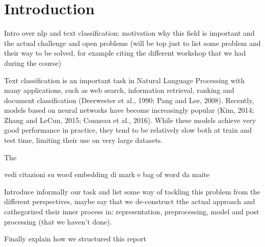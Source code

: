 \section{Introduction} \label{sec:introduction}

Intro over nlp and text classification: motivation why this field is important and the actual challenge and open problems (will be top just to list some problem and their way to be solved, for example citing the different workshop that we had during the course)


Text classification is an important task in Natural Language Processing with many applications, such as web search, information retrieval, ranking and document classification (Deerwester et al., 1990; Pang and Lee, 2008). Recently, models based on neural networks have become increasingly popular (Kim, 2014; Zhang and LeCun, 2015; Conneau et al., 2016). While these models achieve very good performance in practice, they tend to be relatively slow both at train and test time, limiting their use on very large datasets.

The 

vedi citazioni su word embedding di mark e bag of word da maite

Introduce informally our task and list some way of tackling this problem from the different perspectives, maybe say that we de-construct tthe actual approach and cathegorized their inner process in: representation, preprocessing, model and post processing (that we haven't done).

Finally explain how we structured this report



